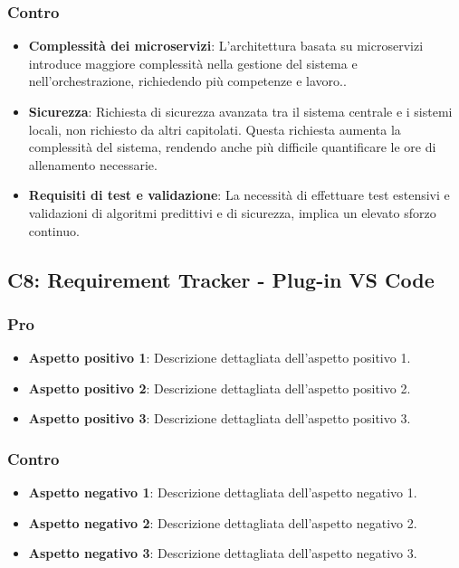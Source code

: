 \subsubsection{Contro}

\begin{itemize}
    \item \textbf{Complessità dei microservizi}: L'architettura basata su microservizi introduce maggiore complessità nella gestione del sistema e nell'orchestrazione, richiedendo più competenze e lavoro..
    \item \textbf{Sicurezza}: Richiesta di sicurezza avanzata tra il sistema centrale e i sistemi locali, non richiesto da altri capitolati. Questa richiesta aumenta la complessità del sistema, rendendo anche più difficile quantificare le ore di allenamento necessarie.
    \item \textbf{Requisiti di test e validazione}: La necessità di effettuare test estensivi e validazioni di algoritmi predittivi e di sicurezza, implica un elevato sforzo continuo.
\end{itemize}


\subsection{C8: Requirement Tracker - Plug-in VS Code}

\subsubsection{Pro}

\begin{itemize}
    \item \textbf{Aspetto positivo 1}: Descrizione dettagliata dell'aspetto positivo 1.
    \item \textbf{Aspetto positivo 2}: Descrizione dettagliata dell'aspetto positivo 2.
    \item \textbf{Aspetto positivo 3}: Descrizione dettagliata dell'aspetto positivo 3.
\end{itemize}

\subsubsection{Contro}

\begin{itemize}
    \item \textbf{Aspetto negativo 1}: Descrizione dettagliata dell'aspetto negativo 1.
    \item \textbf{Aspetto negativo 2}: Descrizione dettagliata dell'aspetto negativo 2.
    \item \textbf{Aspetto negativo 3}: Descrizione dettagliata dell'aspetto negativo 3.
\end{itemize}